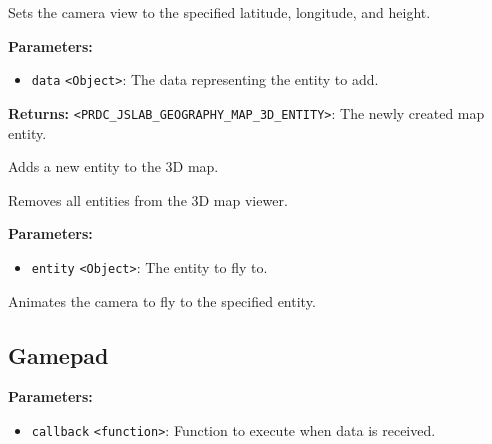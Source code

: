 \documentclass[12pt,a4paper]{article}
\begin{document}
\noindent Sets the camera view to the specified latitude, longitude, and height.

\vspace{5mm}
\noindent {}


\noindent \textbf{Parameters:}
\begin{itemize}
  \item \texttt{data} \texttt{<Object>}: The data representing the entity to add.
\end{itemize}

\noindent \textbf{Returns:} \texttt{<PRDC\_JSLAB\_GEOGRAPHY\_MAP\_3D\_ENTITY>}: The newly created map entity.

\noindent Adds a new entity to the 3D map.

\vspace{5mm}
\noindent {}


\noindent Removes all entities from the 3D map viewer.

\vspace{5mm}
\noindent {}


\noindent \textbf{Parameters:}
\begin{itemize}
  \item \texttt{entity} \texttt{<Object>}: The entity to fly to.
\end{itemize}

\noindent Animates the camera to fly to the specified entity.


\subsection{Gamepad}
\vspace{5mm}
\noindent {}


\noindent \textbf{Parameters:}
\begin{itemize}
  \item \texttt{callback} \texttt{<function>}: Function to execute when data is received.
\end{itemize}
\end{document}
